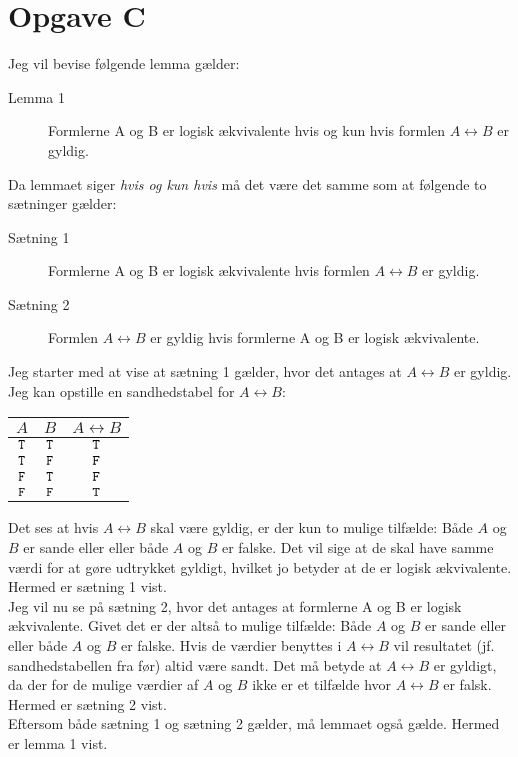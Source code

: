 \section*{Opgave C}
Jeg vil bevise følgende lemma gælder:
\begin{description}
  \item[Lemma 1] Formlerne A og B er logisk ækvivalente hvis og kun hvis formlen $A \leftrightarrow B$ er gyldig.
\end{description}
Da lemmaet siger \emph{hvis og kun hvis} må det være det samme som at følgende to sætninger gælder:
\begin{description}
  \item[Sætning 1] Formlerne A og B er logisk ækvivalente hvis formlen $A \leftrightarrow B$ er gyldig.
  \item[Sætning 2] Formlen $A \leftrightarrow B$ er gyldig hvis formlerne A og B er logisk ækvivalente.
\end{description}
Jeg starter med at vise at sætning 1 gælder, hvor det antages at $A \leftrightarrow B$ er gyldig. Jeg kan opstille en sandhedstabel for $A \leftrightarrow B$:
  \begin{center}
    \begin{tabular}{cc|c}
    \textbf{$A$} & \textbf{$B$} & \textbf{$A \leftrightarrow B$} \\

    \hline

    $\mathtt{T}$ & $\mathtt{T}$ & $\mathtt{T}$ \\
    $\mathtt{T}$ & $\mathtt{F}$ & $\mathtt{F}$ \\
    $\mathtt{F}$ & $\mathtt{T}$ & $\mathtt{F}$ \\
    $\mathtt{F}$ & $\mathtt{F}$ & $\mathtt{T}$
    \end{tabular}
  \end{center}
Det ses at hvis $A \leftrightarrow B$ skal være gyldig, er der kun to mulige tilfælde: Både $A$ og $B$ er sande eller eller både $A$ og $B$ er falske. Det vil sige at de skal have samme værdi for at gøre udtrykket gyldigt, hvilket jo betyder at de er logisk ækvivalente. Hermed er sætning 1 vist.\\

\noindent
Jeg vil nu se på sætning 2, hvor det antages at formlerne A og B er logisk ækvivalente. Givet det er der altså to mulige tilfælde: Både $A$ og $B$ er sande eller eller både $A$ og $B$ er falske. Hvis de værdier benyttes i $A \leftrightarrow B$ vil resultatet (jf. sandhedstabellen fra før) altid være sandt. Det må betyde at $A \leftrightarrow B$ er gyldigt, da der for de mulige værdier af $A$ og $B$ ikke er et tilfælde hvor $A \leftrightarrow B$ er falsk. Hermed er sætning 2 vist.\\

\noindent
Eftersom både sætning 1 og sætning 2 gælder, må lemmaet også gælde. Hermed er lemma 1 vist.